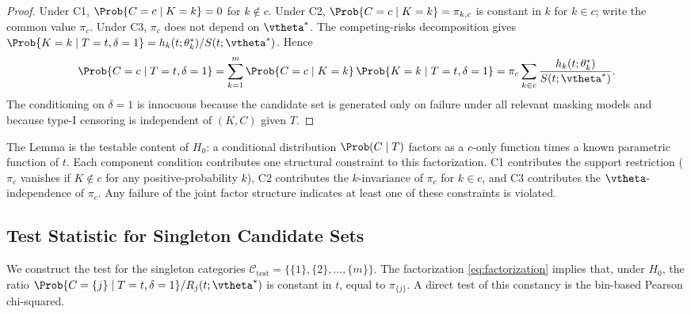 \begin{proof}
Under C1, $\Prob\{C = c \mid K = k\} = 0$ for $k \notin c$. Under C2,
$\Prob\{C = c \mid K = k\} = \pi_{k,c}$ is constant in $k$ for $k \in c$;
write the common value $\pi_c$. Under C3, $\pi_c$ does not depend on
$\vtheta^*$. The competing-risks decomposition gives
$\Prob\{K = k \mid T = t, \delta = 1\} = h_k(t; \theta_k^*) / S(t; \vtheta^*)$.
Hence
\begin{equation*}
    \Prob\{C = c \mid T = t, \delta = 1\}
    = \sum_{k=1}^{m} \Prob\{C = c \mid K = k\}\,
                      \Prob\{K = k \mid T = t, \delta = 1\}
    = \pi_c \sum_{k \in c} \frac{h_k(t; \theta_k^*)}{S(t; \vtheta^*)}.
\end{equation*}
The conditioning on $\delta = 1$ is innocuous because the candidate set
is generated only on failure under all relevant masking models and
because type-I censoring is independent of $(K, C)$ given $T$.
\end{proof}

The Lemma is the testable content of $H_0$: a conditional distribution
$\Prob(C \mid T)$ factors as a $c$-only function times a known parametric
function of $t$. Each component condition contributes one structural
constraint to this factorization. C1 contributes the support restriction
($\pi_c$ vanishes if $K \notin c$ for any positive-probability $k$), C2
contributes the $k$-invariance of $\pi_c$ for $k \in c$, and C3 contributes
the $\vtheta$-independence of $\pi_c$. Any failure of the joint factor
structure indicates at least one of these constraints is violated.

\subsection{Test Statistic for Singleton Candidate Sets}
\label{sec:spec-test-stat}

We construct the test for the singleton categories
$\mathcal{C}_{\mathrm{test}} = \{\{1\}, \{2\}, \ldots, \{m\}\}$. The
factorization \eqref{eq:factorization} implies that, under $H_0$, the
ratio $\Prob\{C = \{j\} \mid T = t, \delta = 1\} / R_j(t; \vtheta^*)$ is
constant in $t$, equal to $\pi_{\{j\}}$. A direct test of this constancy
is the bin-based Pearson chi-squared.

